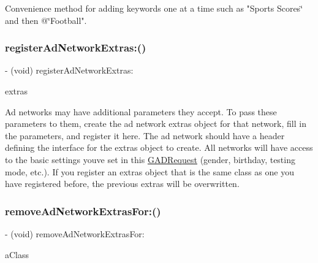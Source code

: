 Convenience method for adding keywords one at a time such as "Sports Scores\char`\"{} and then
@\char`\"{}Football". \mbox{\label{interfaceGADRequest_acaa89d7cc5abf9313c039bc91bf09359}} 
\subsubsection{\texorpdfstring{register\+Ad\+Network\+Extras\+:()}{registerAdNetworkExtras:()}}
{\footnotesize\ttfamily -\/ (void) register\+Ad\+Network\+Extras\+: \begin{DoxyParamCaption}\item[{(id$<$ \hyperlink{protocolGADAdNetworkExtras-p}{G\+A\+D\+Ad\+Network\+Extras} $>$)}]{extras }\end{DoxyParamCaption}}

Ad networks may have additional parameters they accept. To pass these parameters to them, create the ad network extras object for that network, fill in the parameters, and register it here. The ad network should have a header defining the interface for the \textquotesingle{}extras\textquotesingle{} object to create. All networks will have access to the basic settings you\textquotesingle{}ve set in this \hyperlink{interfaceGADRequest}{G\+A\+D\+Request} (gender, birthday, testing mode, etc.). If you register an extras object that is the same class as one you have registered before, the previous extras will be overwritten. \mbox{\label{interfaceGADRequest_aa22171cb82d2fedd19cbdd84aae4d653}} 
\subsubsection{\texorpdfstring{remove\+Ad\+Network\+Extras\+For\+:()}{removeAdNetworkExtrasFor:()}}
{\footnotesize\ttfamily -\/ (void) remove\+Ad\+Network\+Extras\+For\+: \begin{DoxyParamCaption}\item[{(Class$<$ \hyperlink{protocolGADAdNetworkExtras-p}{G\+A\+D\+Ad\+Network\+Extras} $>$)}]{a\+Class }\end{DoxyParamCaption}}

